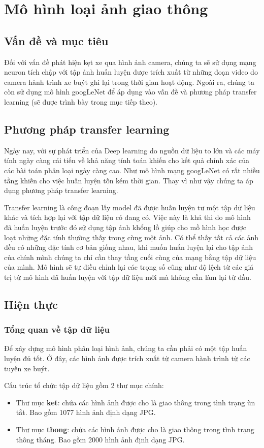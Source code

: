 \chapter{Mô hình loại ảnh giao thông}
\section{Vấn đề và mục tiêu}
	Đối với vấn đề phát hiện kẹt xe qua hình ảnh camera, chúng ta sẽ sử dụng mạng neuron tích chập với tập ảnh huấn luyện được trích xuất từ những đoạn video do camera hành trình xe buýt ghi lại trong thời gian hoạt động. Ngoài ra, chúng ta còn sử dụng mô hình googLeNet để áp dụng vào vấn đề và phương pháp transfer learning (sẽ được trình bày trong mục tiếp theo). \par
\section{Phương pháp transfer learning}
	Ngày nay, với sự phát triển của Deep learning do nguồn dữ liệu to lớn và các máy tính ngày càng cải tiến về khả năng tính toán khiến cho kết quả chính xác của các bài toán phân loại ngày càng cao. Như mô hình mạng googLeNet có rất nhiều tầng khiến cho việc huấn luyện tốn kém thời gian. Thay vì như vậy chúng ta áp dụng phương pháp transfer learning.\par
	Transfer learning là công đoạn lấy model đã được huấn luyện tư một tập dữ liệu khác \cite{transfer} và tích hợp lại với tập dữ liệu có đang có. Việc này là khả thi do mô hình đã huấn luyện trước đó sử dụng tập ảnh khổng lồ giúp cho mồ hình học được loạt những đặc tính thường thấy trong cùng một ảnh. Có thể thấy tất cả các ảnh đều có những đặc tính cơ bản giống nhau, khi muốn huấn luyện lại cho tập ảnh của chính mình chúng ta chỉ cần thay tầng cuối cùng của mạng bằng tập dữ liệu của mình. Mô hình sẽ tự điều chỉnh lại các trọng số cũng như độ lệch từ các giá trị từ mô hình đã huấn luyện với tập dữ liệu mới mà không cần làm lại từ đầu.

\section{Hiện thực}
\subsection{Tổng quan về tập dữ liệu}
	Để xây dựng mô hình phân loại hình ảnh, chúng ta cần phải có một tập huấn luyện đủ tốt. Ở đây, các hình ảnh được trích xuất từ camera hành trình từ các tuyến xe buýt. \par
	Cấu trúc tổ chức tập dữ liệu gồm 2 thư mục chính:
	\begin{itemize}
		\item Thư mục \textbf{ket}: chứa các hình ảnh được cho là giao thông trong tình trạng ùn tắt. Bao gồm 1077 hình ảnh định dạng JPG.
		\item Thư mục \textbf{thong}: chứa các hình ảnh được cho là giao thông trong tình trạng thông tháng. Bao gồm 2000 hình ảnh định dạng JPG.
	\end{itemize}

